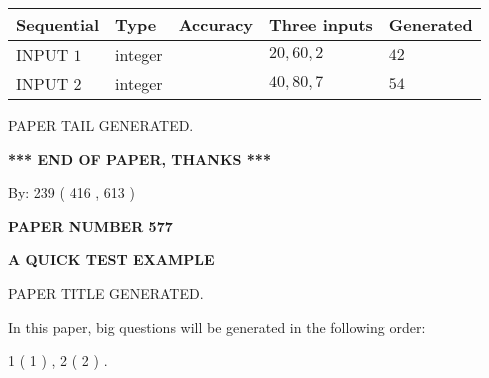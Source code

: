 \documentclass[12pt]{article}
\begin{document}
   
  
  
\noindent\begin{tabular}{|l|l|l|l|l|}
\hline
 Sequential & Type & Accuracy & Three inputs & Generated \\ 
\hline
 
 
  INPUT $  1 $ & integer &  & $
 20
 , 
 60
 , 
 2
 $ & $ 42 $ 
 \\  \hline  
 
 
  INPUT $  2 $ & integer &  & $
 40
 , 
 80
 , 
 7
 $ & $ 54 $ 
 \\  \hline  
 \end{tabular}
   
   
   
   
   
   
 \vspace{0.2in}
 
   
   
\vspace{2.0in} PAPER TAIL GENERATED.
   
   
   
   
\vspace{1.0in} 
{\textbf{\large{ *** END OF PAPER, THANKS *** }}} 
   
   
\hspace{1.0in} By: 
 239 ( 416 ,  613 )
   
   
   
   
\newpage 
\setcounter{page}{ 
   577001 } 
   
   
   
   
 {\textbf{ \Large{ PAPER NUMBER  577  }}}
   
   
\vspace{0.2in}
   
   
   
   
   
   
   
   
 \vspace{0.2in}
{\LARGE {\textbf{ A QUICK TEST EXAMPLE}}}
   
   
 PAPER TITLE GENERATED.
   
   
   
\vspace{0.2in}
   
In this paper, big questions will be generated in the following order: 
   
   
   1 ( 1 )
 ,
   2 ( 2 )
 .
  
\vspace{0.2in}
  
\end{document}
